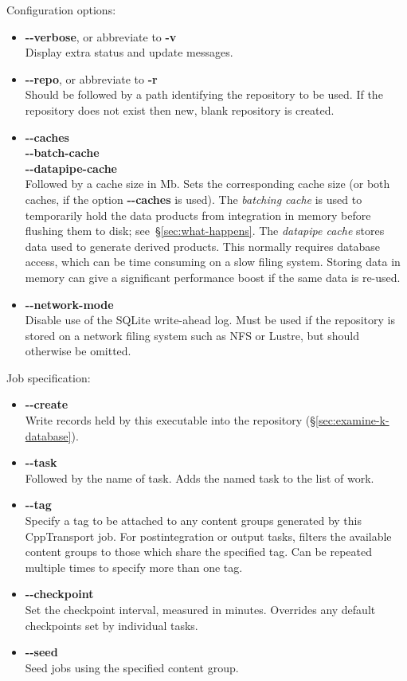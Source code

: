 \documentclass[11pt,a4paper]{article}
\newcommand{\packagefont}{\sffamily}
\newcommand{\CppTransport}{{\packagefont CppTransport}}
\newcommand{\SQLite}{{\packagefont SQLite}}
\newcommand{\option}[1]{{\ttfamily\bfseries\small #1}}
\begin{document}
\noindent Configuration options:
\begin{itemize}
	\item \option{{-}{-}verbose}, or abbreviate to \option{-v} \\
	Display extra status and update messages.
	
	\item \option{{-}{-}repo}, or abbreviate to \option{-r} \\
	Should be followed by a path identifying the repository to be used.
	If the repository does not exist then new, blank repository is created.
	
	\item \option{{-}{-}caches} \\
	\option{{-}{-}batch-cache} \\
	\option{{-}{-}datapipe-cache} \\
	Followed by a cache size in Mb. Sets the corresponding cache size
	(or both caches, if the option \option{{-}{-}caches} is used).
	The \emph{batching cache} is used to temporarily
	hold the data products from integration in memory before
	flushing them to disk; see~\S\ref{sec:what-happens}.
	The \emph{datapipe cache} stores data used to generate derived products.
	This normally requires database access, which can be time consuming on a slow
	filing system. Storing data in memory can give a significant performance
	boost if the same data is re-used.
	
	\item \option{{-}{-}network-mode} \\
	Disable use of the {\SQLite} write-ahead log. Must be used if the repository
	is stored on a network filing system such as NFS or Lustre, but should
	otherwise be omitted.
\end{itemize}

\noindent Job specification:
\begin{itemize}
	\item \option{{-}{-}create} \\
	Write records held by this executable into the repository (\S\ref{sec:examine-k-database}).
	
	\item \option{{-}{-}task} \\
	Followed by the name of task. Adds the named task to the list of work.
	
	\item \option{{-}{-}tag} \\
	Specify a tag to be attached to any content groups generated by this
	{\CppTransport} job.
	For postintegration or output tasks,
	filters the available content groups to those which share the specified tag.
	Can be repeated multiple times to specify more than one tag.
	
	\item \option{{-}{-}checkpoint} \\
	Set the checkpoint interval, measured in minutes.
	Overrides any default checkpoints set by individual tasks.
	
	\item \option{{-}{-}seed} \\
	Seed jobs using the specified content group.	
\end{itemize}
\end{document}
